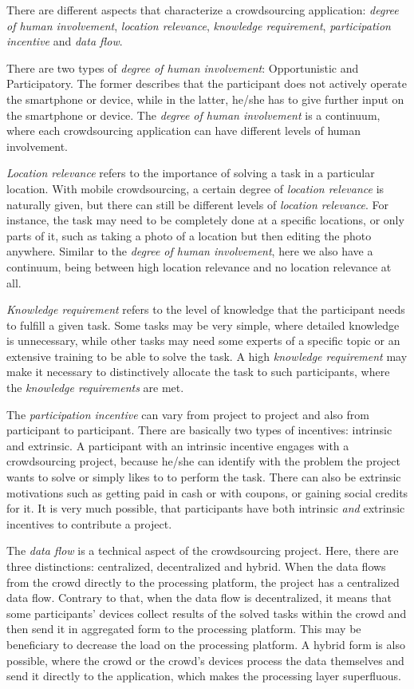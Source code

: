 There are different aspects that characterize a crowdsourcing application: \textit{degree of human involvement}, \textit{location relevance}, \textit{knowledge requirement}, \textit{participation incentive} and \textit{data flow}.

There are two types of \textit{degree of human involvement}: Opportunistic and Participatory.
The former describes that the participant does not actively operate the smartphone or device, while in the latter, he/she has to give further input on the smartphone or device.
The \textit{degree of human involvement} is a continuum, where each crowdsourcing application can have different levels of human involvement.

\textit{Location relevance} refers to the importance of solving a task in a particular location.
With mobile crowdsourcing, a certain degree of \textit{location relevance} is naturally given, but there can still be different levels of \textit{location relevance}.
For instance, the task may need to be completely done at a specific locations, or only parts of it, such as taking a photo of a location but then editing the photo anywhere.
Similar to the \textit{degree of human involvement}, here we also have a continuum, being between high location relevance and no location relevance at all.

\textit{Knowledge requirement} refers to the level of knowledge that the participant needs to fulfill a given task.
Some tasks may be very simple, where detailed knowledge is unnecessary, while other tasks may need some experts of a specific topic or an extensive training to be able to solve the task.
A high \textit{knowledge requirement} may make it necessary to distinctively allocate the task to such participants, where the \textit{knowledge requirements} are met.

The \textit{participation incentive} can vary from project to project and also from participant to participant.
There are basically two types of incentives: intrinsic and extrinsic.
A participant with an intrinsic incentive engages with a crowdsourcing project, because he/she can identify with the problem the project wants to solve or simply likes to to perform the task.
There can also be extrinsic motivations such as getting paid in cash or with coupons, or gaining social credits for it.
It is very much possible, that participants have both intrinsic \textit{and} extrinsic incentives to contribute a project.

The \textit{data flow} is a technical aspect of the crowdsourcing project.
Here, there are three distinctions: centralized, decentralized and hybrid.
When the data flows from the crowd directly to the processing platform, the project has a centralized data flow.
Contrary to that, when the data flow is decentralized, it means that some participants' devices collect results of the solved tasks within the crowd and then send it in aggregated form to the processing platform.
This may be beneficiary to decrease the load on the processing platform.
A hybrid form is also possible, where the crowd or the crowd's devices process the data themselves and send it directly to the application, which makes the processing layer superfluous. 


